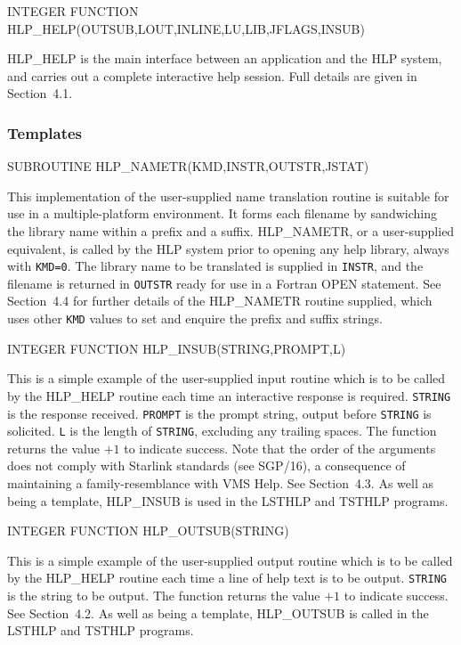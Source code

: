 \documentclass[11pt,nolof]{starlink}
\begin{document}
\begin{terminalv}
INTEGER FUNCTION HLP_HELP(OUTSUB,LOUT,INLINE,LU,LIB,JFLAGS,INSUB)
\end{terminalv}
HLP\_HELP is the main interface between an application and the
HLP system, and carries out a complete interactive help session.
Full details are given in Section~4.1.

\subsubsection{Templates}
\begin{terminalv}
SUBROUTINE HLP_NAMETR(KMD,INSTR,OUTSTR,JSTAT)
\end{terminalv}
This implementation of the user-supplied name translation routine is
suitable for use in a multiple-platform environment.  It forms each
filename by sandwiching the library name within a prefix and a suffix.
HLP\_NAMETR, or a user-supplied equivalent, is called by the
HLP system prior to opening any help library, always
with \texttt{KMD=0}.  The
library name to be translated is supplied in \texttt{INSTR}, and
the filename is returned in \texttt{OUTSTR} ready for use in a
Fortran OPEN statement.
See Section~4.4 for further details of the HLP\_NAMETR routine
supplied, which uses other \texttt{KMD} values to set and enquire the
prefix and suffix strings.

\begin{terminalv}
INTEGER FUNCTION HLP_INSUB(STRING,PROMPT,L)
\end{terminalv}
This is a simple example of the user-supplied input
routine which is to be called by the HLP\_HELP routine each
time an interactive response is required.  \texttt{STRING} is the response
received. \texttt{PROMPT} is the prompt string,
output before \texttt{STRING} is solicited.  \texttt{L} is the length
of \texttt{STRING}, excluding any trailing spaces.  The function
returns the value $+1$ to indicate success.  Note that the order of
the arguments does not comply with Starlink standards (see SGP/16),
a consequence of maintaining a family-resemblance with VMS Help.  See
Section~4.3.  As well as being a template, HLP\_INSUB is used in
the LSTHLP and TSTHLP programs.

\begin{terminalv}
INTEGER FUNCTION HLP_OUTSUB(STRING)
\end{terminalv}
This is a simple example of the user-supplied output routine which is
to be called by the HLP\_HELP routine each time a line of help text
is to be output.
\texttt{STRING} is the string to be output.  The function
returns the value $+1$ to indicate success.  See Section~4.2.
As well as being a template, HLP\_OUTSUB is called in
the LSTHLP and TSTHLP programs.
\end{document}
